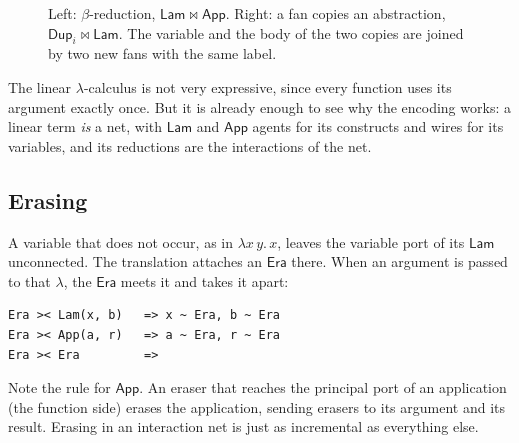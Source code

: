 \documentclass[11pt,a4paper]{article}
\newcommand{\ag}[1]{\mathsf{#1}}
\newcommand{\Dup}{\ag{Dup}}
\newcommand{\Era}{\ag{Era}}
\newcommand{\Lam}{\ag{Lam}}
\newcommand{\App}{\ag{App}}
\newcommand{\act}{\mathrel{\bowtie}}
\newcommand{\Up}[5][]{%
  \node[agent,#1] (#2) at (#3) {#4};
  \coordinate (#2-0) at (#2.corner 1);
  \ifnum#5=1 \coordinate (#2-1) at ($(#2.corner 2)!.5!(#2.corner 3)$);\fi
  \ifnum#5=2 \coordinate (#2-1) at ($(#2.corner 2)!.27!(#2.corner 3)$);
    \coordinate (#2-2) at ($(#2.corner 2)!.73!(#2.corner 3)$);\fi
  \node[pp] at (#2-0) {};}
\newcommand{\Down}[5][]{%
  \node[agent,regular polygon rotate=180,#1] (#2) at (#3) {#4};
  \coordinate (#2-0) at (#2.corner 1);
  \ifnum#5=1 \coordinate (#2-1) at ($(#2.corner 3)!.5!(#2.corner 2)$);\fi
  \ifnum#5=2 \coordinate (#2-1) at ($(#2.corner 3)!.27!(#2.corner 2)$);
    \coordinate (#2-2) at ($(#2.corner 3)!.73!(#2.corner 2)$);\fi
  \node[pp] at (#2-0) {};}
\newcommand{\ruleto}[1]{\node[font=\Large] at (#1) {$\Rightarrow$};}
\theoremstyle{definition}
\theoremstyle{plain}
\begin{document}
\begin{figure}[t]
\centering
{}
\hspace{1.8cm}
\caption{Left: $\beta$-reduction, $\Lam\act\App$. Right: a fan copies an
abstraction, $\Dup_i\act\Lam$. The variable and the body of the two copies
are joined by two new fans with the same label.}
\label{fig:beta}
\end{figure}

\noindent
The linear $\lambda$-calculus is not very expressive, since every function
uses its argument exactly once. But it is already enough to see why the
encoding works: a linear term \emph{is} a net, with $\Lam$ and $\App$ agents
for its constructs and wires for its variables, and its reductions are the
interactions of the net.

\subsection{Erasing}

A variable that does not occur, as in $\lambda x\,y.\,x$, leaves the
variable port of its $\Lam$ unconnected. The translation attaches an $\Era$
there. When an argument is passed to that $\lambda$, the $\Era$ meets it and
takes it apart:
\begin{lstlisting}
Era >< Lam(x, b)   => x ~ Era, b ~ Era
Era >< App(a, r)   => a ~ Era, r ~ Era
Era >< Era         =>
\end{lstlisting}
Note the rule for $\App$. An eraser that reaches the principal port of an
application (the function side) erases the application, sending erasers to
its argument and its result. Erasing in an interaction net is just as
incremental as everything else.
\end{document}
